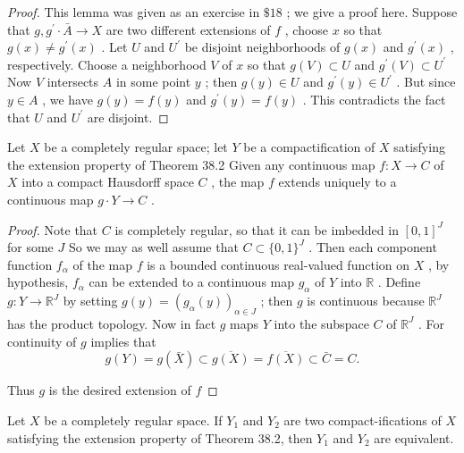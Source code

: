 \begin{proof}This lemma was given as an exercise in \(\$ {18}\) ; we give a proof here. Suppose that \(g,{g}^{\prime } \cdot  \bar{A} \rightarrow  X\) are two different extensions of \(f\) , choose \(x\) so that \(g\left( x\right)  \neq  {g}^{\prime }\left( x\right)\) . Let \(U\) and \({U}^{\prime }\) be disjoint neighborhoods of \(g\left( x\right)\) and \({g}^{\prime }\left( x\right)\) , respectively. Choose a neighborhood \(V\) of \(x\) so that \(g\left( V\right)  \subset  U\) and \({g}^{\prime }\left( V\right)  \subset  {U}^{\prime }\) Now \(V\) intersects \(A\) in some point \(y\) ; then \(g\left( y\right)  \in  U\) and \({g}^{\prime }\left( y\right)  \in  {U}^{\prime }\) . But since \(y \in  A\) , we have \(g\left( y\right)  = f\left( y\right)\) and \({g}^{\prime }\left( y\right)  = f\left( y\right)\) . This contradicts the fact that \(U\) and \({U}^{\prime }\) are disjoint.\end{proof}
\begin{theorem} Let \(X\) be a completely regular space; let \(Y\) be a compactification of \(X\) satisfying the extension property of Theorem 38.2 Given any continuous map \(f : X \rightarrow  C\) of \(X\) into a compact Hausdorff space \(C\) , the map \(f\) extends uniquely to a continuous map \(g \cdot  Y \rightarrow  C\) .
\end{theorem}

\begin{proof}Note that \(C\) is completely regular, so that it can be imbedded in \({\left\lbrack  0,1\right\rbrack  }^{J}\) for some \(J\) So we may as well assume that \(C \subset  \{ 0,1{\} }^{J}\) . Then each component function \({f}_{\alpha }\) of the map \(f\) is a bounded continuous real-valued function on \(X\) , by hypothesis, \({f}_{\alpha }\) can be extended to a continuous map \({g}_{\alpha }\) of \(Y\) into \(\mathbb{R}\) . Define \(g : Y \rightarrow  {\mathbb{R}}^{J}\) by setting \(g\left( y\right)  = {\left( {g}_{\alpha }\left( y\right) \right) }_{\alpha  \in  J}\) ; then \(g\) is continuous because \({\mathbb{R}}^{J}\) has the product topology. Now in fact \(g\) maps \(Y\) into the subspace \(C\) of \({\mathbb{R}}^{J}\) . For continuity of \(g\) implies that
\[
g\left( Y\right)  = g\left( \bar{X}\right)  \subset  \overline{g\left( X\right) } = \overline{f\left( X\right) } \subset  \bar{C} = C.
\]

Thus \(g\) is the desired extension of \(f\)
\end{proof}
\begin{theorem} Let \(X\) be a completely regular space. If \({Y}_{1}\) and \({Y}_{2}\) are two compact-ifications of \(X\) satisfying the extension property of Theorem 38.2, then \({Y}_{1}\) and \({Y}_{2}\) are equivalent.
\end{theorem}

